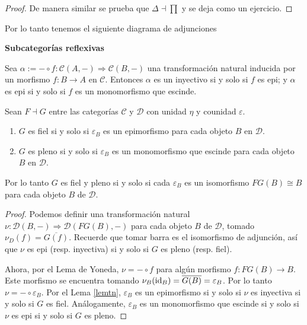 \documentclass{comunicaciones}
\begin{document}
\begin{ej}
\begin{proof}
		De manera similar se prueba que $\Delta\dashv \prod$ y se deja como un ejercicio.
	\end{proof}
	
	Por lo tanto tenemos el siguiente diagrama de adjunciones
	\begin{center}
	\end{center}
\end{ej} 

\textbf{Subcategor\'ias reflexivas}

\begin{lem}\label{lemtn}
	Sea $\alpha:=-\circ f:\mathcal{C}(A,-)\Rightarrow \mathcal{C}(B,-)$ una transformaci\'on natural inducida por un morfismo $f:B\to A$ en $\mathcal{C}$. Entonces $\alpha$ es un inyectivo si y solo si $f$ es epi; y $\alpha$ es epi si y solo si $f$ es un monomorfismo que escinde.
\end{lem}

\begin{thm}
	Sean $F\dashv G$ entre las categor\'ias $\mathcal{C}$ y $\mathcal{D}$ con unidad $\eta$ y counidad $\varepsilon$.
	\begin{enumerate}
		\item $G$ es fiel si y solo si $\varepsilon_{B}$ es un epimorfismo para cada objeto $B$ en $\mathcal{D}$.
		\item $G$ es pleno si y solo si $\varepsilon_{B}$ es un monomorfismo que escinde para cada objeto $B$ en $\mathcal{D}$.
	\end{enumerate}
	Por lo tanto $G$ es fiel y pleno si y solo si cada $\varepsilon_{B}$ es un isomorfismo $FG(B)\cong B$ para cada objeto $B$ de $\mathcal{D}$.
\end{thm}

\begin{proof}
	Podemos definir una transformaci\'on natural $\nu:\mathcal{D}(B,-)\Rightarrow\mathcal{D}(FG(B),-)$ para cada objeto $B$ de $\mathcal{D}$, tomado $\nu_D(f)=\overline{G(f)}$. Recuerde que tomar barra es el isomorfismo de adjunci\'on, as\'i que $\nu$ es epi (resp. inyectiva) si y solo si $G$ es pleno (resp. fiel).  
	
	Ahora, por el Lema de Yoneda, $\nu=-\circ f$ para alg\'un morfismo $f:FG(B)\to B$. Este morfismo se encuentra tomando $\nu_B(\mathrm{id}_B)=\overline{G(B)}=\varepsilon_{B}$. Por lo tanto $\nu=-\circ \varepsilon_{B}$. Por el Lema \ref{lemtn}, $\varepsilon_{B}$ es un epimorfismo si y solo si $\nu$ es inyectiva si y solo si $G$ es fiel. An\'alogamente, $\varepsilon_{B}$ es un monomorfismo que escinde si y solo si $\nu$ es epi si y solo si $G$ es pleno.	
\end{proof}
\end{document}
